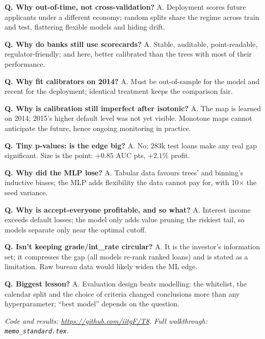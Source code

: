 \documentclass[a4paper,10pt]{article}
\begin{document}
\textbf{Q. Why out-of-time, not cross-validation?} A. Deployment scores future applicants under a different economy; random splits share the regime across train and test, flattering flexible models and hiding drift.

\textbf{Q. Why do banks still use scorecards?} A. Stable, auditable, point-readable, regulator-friendly; and here, better calibrated than the trees with most of their performance.

\textbf{Q. Why fit calibrators on 2014?} A. Must be out-of-sample for the model and recent for the deployment; identical treatment keeps the comparison fair.

\textbf{Q. Why is calibration still imperfect after isotonic?} A. The map is learned on 2014; 2015's higher default level was not yet visible. Monotone maps cannot anticipate the future, hence ongoing monitoring in practice.

\textbf{Q. Tiny p-values: is the edge big?} A. No; 283k test loans make any real gap significant. Size is the point: $+0.85$ AUC pts, $+2.1\%$ profit.

\textbf{Q. Why did the MLP lose?} A. Tabular data favours trees' and binning's inductive biases; the MLP adds flexibility the data cannot pay for, with 10$\times$ the seed variance.

\textbf{Q. Why is accept-everyone profitable, and so what?} A. Interest income exceeds default losses; the model only adds value pruning the riskiest tail, so models separate only near the optimal cutoff.

\textbf{Q. Isn't keeping grade/int\_rate circular?} A. It is the investor's information set; it compresses the gap (all models re-rank ranked loans) and is stated as a limitation. Raw bureau data would likely widen the ML edge.

\textbf{Q. Biggest lesson?} A. Evaluation design beats modelling: the whitelist, the calendar split and the choice of criteria changed conclusions more than any hyperparameter; ``best model'' depends on the question.

\vspace{2mm}
\textit{Code and results: \url{https://github.com/iitgF/T8}. Full walkthrough: \texttt{memo\_standard.tex}.}
\end{document}
